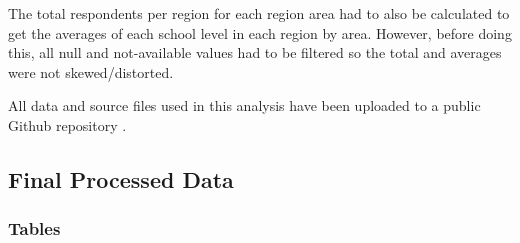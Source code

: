 \documentclass[stu, 12pt, floatsintext,longtable]{apa7}
\begin{document}
The total respondents per region for each region area had to also be calculated
to
get the
averages of each school level in each region by area. However, before doing
this,
all null and not-available values had to be filtered so the total and averages
were not skewed/distorted.

All data and source files used in this analysis have been uploaded to a public
Github repository \parencite{githubdata}.

\newpage
\subsection{Final Processed Data}
\subsubsection{Tables}
\end{document}
